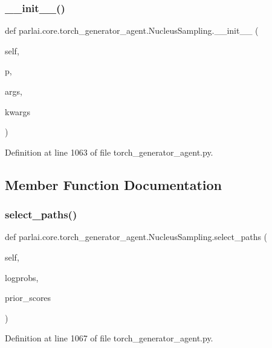 \subsubsection{\texorpdfstring{\+\_\+\+\_\+init\+\_\+\+\_\+()}{\_\_init\_\_()}}
{\footnotesize\ttfamily def parlai.\+core.\+torch\+\_\+generator\+\_\+agent.\+Nucleus\+Sampling.\+\_\+\+\_\+init\+\_\+\+\_\+ (\begin{DoxyParamCaption}\item[{}]{self,  }\item[{}]{p,  }\item[{}]{args,  }\item[{}]{kwargs }\end{DoxyParamCaption})}



Definition at line 1063 of file torch\+\_\+generator\+\_\+agent.\+py.



\subsection{Member Function Documentation}
\mbox{\label{classparlai_1_1core_1_1torch__generator__agent_1_1NucleusSampling_a91abde2fb2dccf5cd0564825ddc5ea4d}} 
\subsubsection{\texorpdfstring{select\+\_\+paths()}{select\_paths()}}
{\footnotesize\ttfamily def parlai.\+core.\+torch\+\_\+generator\+\_\+agent.\+Nucleus\+Sampling.\+select\+\_\+paths (\begin{DoxyParamCaption}\item[{}]{self,  }\item[{}]{logprobs,  }\item[{}]{prior\+\_\+scores }\end{DoxyParamCaption})}



Definition at line 1067 of file torch\+\_\+generator\+\_\+agent.\+py.



